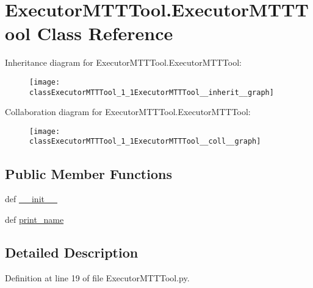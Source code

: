 \hypertarget{classExecutorMTTTool_1_1ExecutorMTTTool}{\section{Executor\-M\-T\-T\-Tool.\-Executor\-M\-T\-T\-Tool Class Reference}
\label{classExecutorMTTTool_1_1ExecutorMTTTool}
}


Inheritance diagram for Executor\-M\-T\-T\-Tool.\-Executor\-M\-T\-T\-Tool\-:\nopagebreak
\begin{figure}[H]
\begin{center}
\leavevmode
\texttt{[image: classExecutorMTTTool\_1\_1ExecutorMTTTool\_\_inherit\_\_graph]}
\end{center}
\end{figure}


Collaboration diagram for Executor\-M\-T\-T\-Tool.\-Executor\-M\-T\-T\-Tool\-:\nopagebreak
\begin{figure}[H]
\begin{center}
\leavevmode
\texttt{[image: classExecutorMTTTool\_1\_1ExecutorMTTTool\_\_coll\_\_graph]}
\end{center}
\end{figure}
\subsection*{Public Member Functions}
\begin{DoxyCompactItemize}
\item 
def \hyperlink{classExecutorMTTTool_1_1ExecutorMTTTool_afe2f512bab6b4779201b91956dcd4097}{\-\_\-\-\_\-init\-\_\-\-\_\-}
\item 
def \hyperlink{classExecutorMTTTool_1_1ExecutorMTTTool_a013abcdbf3fd5b750f66cef671b06a77}{print\-\_\-name}
\end{DoxyCompactItemize}


\subsection{Detailed Description}


Definition at line 19 of file Executor\-M\-T\-T\-Tool.\-py.



